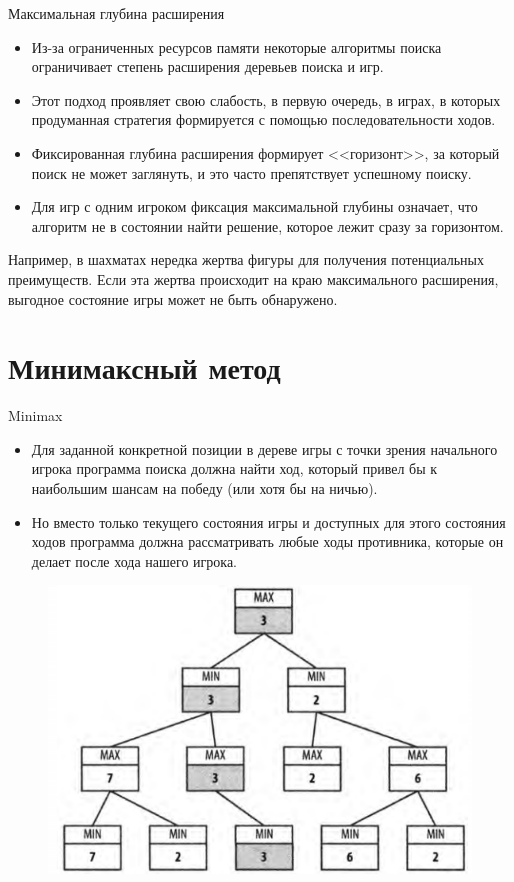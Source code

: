 \documentclass{beamer}
\begin{document}
\begin{frame}{Максимальная глубина расширения}
\begin{itemize}
\item Из-за ограниченных ресурсов памяти некоторые алгоритмы поиска ограничивает
степень расширения деревьев поиска и игр.
\item Этот подход проявляет свою слабость, в первую очередь, в играх, в которых продуманная стратегия формируется с помощью последовательности ходов.
\item Фиксированная глубина расширения формирует <<горизонт>>, за который поиск не может заглянуть, и это часто препятствует успешному поиску. 
\item Для игр с одним игроком фиксация максимальной глубины означает, что алгоритм не в состоянии найти решение, которое лежит сразу за горизонтом.
\end{itemize}
Например, в шахматах нередка жертва фигуры
для получения потенциальных преимуществ. Если эта жертва происходит на краю
максимального расширения, выгодное состояние игры может не быть обнаружено.
\end{frame}

\section{Минимаксный метод}

\begin{frame}{Minimax}
\begin{itemize}
\item Для заданной конкретной позиции в дереве игры с точки зрения начального
игрока программа поиска должна найти ход, который привел бы к наибольшим шансам на победу (или хотя бы на ничью). 
\item Но вместо только текущего состояния игры
и доступных для этого состояния ходов программа должна рассматривать любые
ходы противника, которые он делает после хода нашего игрока. 
\end{itemize}
\begin{figure}[h]
\centering
\includegraphics[scale=0.4]{images/lec05-pic02.png}
\end{figure}
\end{frame}
\end{document}
